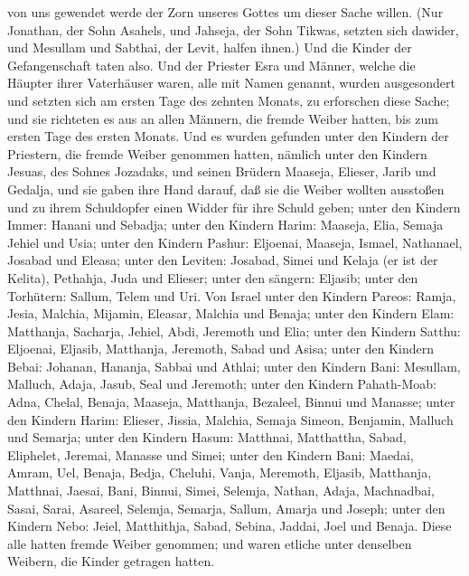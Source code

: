 von uns gewendet werde der Zorn unseres Gottes um dieser Sache willen.
 (Nur Jonathan, der Sohn Asahels, und Jahseja, der Sohn
Tikwas, setzten sich dawider, und Mesullam und Sabthai, der Levit,
halfen ihnen.)  Und die Kinder der Gefangenschaft taten
also. Und der Priester Esra und Männer, welche die Häupter ihrer
Vaterhäuser waren, alle mit Namen genannt, wurden ausgesondert und
setzten sich am ersten Tage des zehnten Monats, zu erforschen diese
Sache;  und sie richteten es aus an allen Männern, die
fremde Weiber hatten, bis zum ersten Tage des ersten Monats.
 Und es wurden gefunden unter den Kindern der Priestern,
die fremde Weiber genommen hatten, nämlich unter den Kindern Jesuas, des
Sohnes Jozadaks, und seinen Brüdern Maaseja, Elieser, Jarib und Gedalja,
 und sie gaben ihre Hand darauf, daß sie die Weiber wollten
ausstoßen und zu ihrem Schuldopfer einen Widder für ihre Schuld geben;
 unter den Kindern Immer: Hanani und Sebadja; 
unter den Kindern Harim: Maaseja, Elia, Semaja Jehiel und Usia;
 unter den Kindern Pashur: Eljoenai, Maaseja, Ismael,
Nathanael, Josabad und Eleasa;  unter den Leviten: Josabad,
Simei und Kelaja (er ist der Kelita), Pethahja, Juda und Elieser;
 unter den sängern: Eljasib; unter den Torhütern: Sallum,
Telem und Uri.  Von Israel unter den Kindern Pareos: Ramja,
Jesia, Malchia, Mijamin, Eleasar, Malchia und Benaja; 
unter den Kindern Elam: Matthanja, Sacharja, Jehiel, Abdi, Jeremoth und
Elia;  unter den Kindern Satthu: Eljoenai, Eljasib,
Matthanja, Jeremoth, Sabad und Asisa;  unter den Kindern
Bebai: Johanan, Hananja, Sabbai und Athlai;  unter den
Kindern Bani: Mesullam, Malluch, Adaja, Jasub, Seal und Jeremoth;
 unter den Kindern Pahath-Moab: Adna, Chelal, Benaja,
Maaseja, Matthanja, Bezaleel, Binnui und Manasse;  unter
den Kindern Harim: Elieser, Jissia, Malchia, Semaja Simeon,
 Benjamin, Malluch und Semarja;  unter den
Kindern Hasum: Matthnai, Matthattha, Sabad, Eliphelet, Jeremai, Manasse
und Simei;  unter den Kindern Bani: Maedai, Amram, Uel,
 Benaja, Bedja, Cheluhi,  Vanja, Meremoth,
Eljasib,  Matthanja, Matthnai, Jaesai,  Bani,
Binnui, Simei,  Selemja, Nathan, Adaja, 
Machnadbai, Sasai, Sarai,  Asareel, Selemja, Semarja,
 Sallum, Amarja und Joseph;  unter den Kindern
Nebo: Jeiel, Matthithja, Sabad, Sebina, Jaddai, Joel und Benaja.
 Diese alle hatten fremde Weiber genommen; und waren
etliche unter denselben Weibern, die Kinder getragen hatten.
